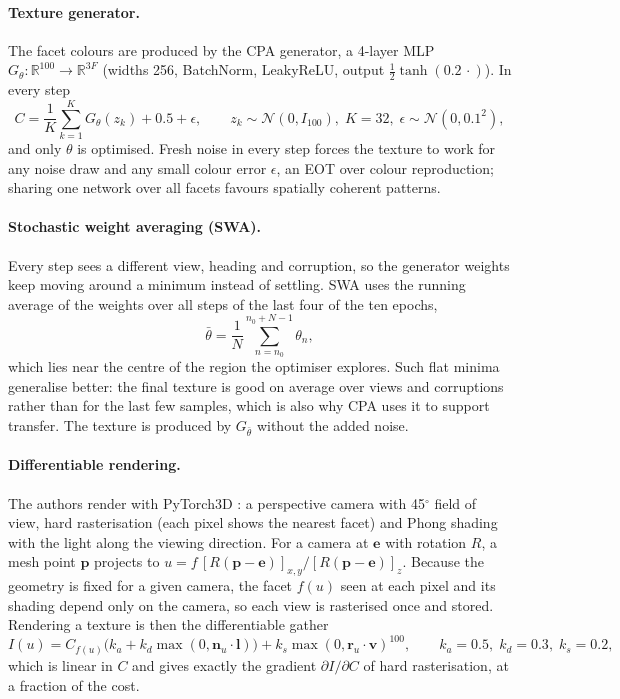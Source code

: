 \documentclass[11pt,a4paper]{article}
\begin{document}
\paragraph{Texture generator.} The facet colours are produced by the CPA generator, a 4-layer MLP $G_\theta:\mathbb{R}^{100}\to\mathbb{R}^{3F}$ (widths 256, BatchNorm, LeakyReLU, output $\tfrac12\tanh(0.2\,\cdot)$). In every step
\begin{equation}
C=\frac{1}{K}\sum_{k=1}^{K}G_\theta(z_k)+0.5+\epsilon,\qquad z_k\sim\mathcal{N}(0,I_{100}),\;K=32,\;\epsilon\sim\mathcal{N}(0,0.1^2),
\end{equation}
and only $\theta$ is optimised. Fresh noise in every step forces the texture to work for any noise draw and any small colour error $\epsilon$, an EOT over colour reproduction; sharing one network over all facets favours spatially coherent patterns.

\paragraph{Stochastic weight averaging (SWA).} Every step sees a different view, heading and corruption, so the generator weights keep moving around a minimum instead of settling. SWA \cite{izmailov2018swa} uses the running average of the weights over all steps of the last four of the ten epochs,
\begin{equation}
\bar\theta=\frac{1}{N}\sum_{n=n_0}^{n_0+N-1}\theta_n,
\end{equation}
which lies near the centre of the region the optimiser explores. Such flat minima generalise better: the final texture is good on average over views and corruptions rather than for the last few samples, which is also why CPA uses it to support transfer. The texture is produced by $G_{\bar\theta}$ without the added noise.

\paragraph{Differentiable rendering.} The authors render with PyTorch3D \cite{ravi2020pytorch3d}: a perspective camera with 45$^\circ$ field of view, hard rasterisation (each pixel shows the nearest facet) and Phong shading \cite{phong1975} with the light along the viewing direction. For a camera at $\mathbf{e}$ with rotation $R$, a mesh point $\mathbf{p}$ projects to $u=f\,[R(\mathbf{p}-\mathbf{e})]_{x,y}/[R(\mathbf{p}-\mathbf{e})]_{z}$. Because the geometry is fixed for a given camera, the facet $f(u)$ seen at each pixel and its shading depend only on the camera, so each view is rasterised once and stored. Rendering a texture is then the differentiable gather
\begin{equation}
I(u)=C_{f(u)}\big(k_a+k_d\max(0,\mathbf{n}_u\!\cdot\mathbf{l})\big)+k_s\max(0,\mathbf{r}_u\!\cdot\mathbf{v})^{100},\qquad k_a=0.5,\;k_d=0.3,\;k_s=0.2,
\end{equation}
which is linear in $C$ and gives exactly the gradient $\partial I/\partial C$ of hard rasterisation, at a fraction of the cost.
\end{document}
